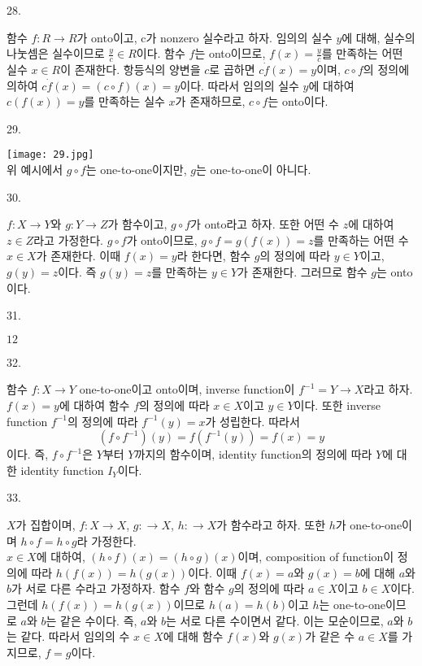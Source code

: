 \documentclass{article}
\begin{document}
28.
\begin{addmargin}[1em]{2em}
함수 $f:R\rightarrow R$가 onto이고, c가 nonzero 실수라고 하자. 임의의 실수 $y$에 대해, 실수의 나눗셈은 실수이므로 $\frac{y}{c}\in R$이다. 함수 $f$는 onto이므로, $f(x)=\frac{y}{c}$를 만족하는 어떤 실수 $x\in R$이 존재한다. 항등식의 양변을 $c$로 곱하면 $c\dot f(x)=y$이며, $c\circ f$의 정의에 의하여 $c\dot f(x)=(c\circ f)(x)=y$이다. 따라서 임의의 실수 $y$에 대하여 $c(f(x))=y$를 만족하는 실수 $x$가 존재하므로, $c\circ f$는 onto이다.

\end{addmargin}
\bigskip

29.
\begin{addmargin}[1em]{2em}
\texttt{[image: 29.jpg]} \\
위 예시에서 $g\circ f$는 one-to-one이지만, $g$는 one-to-one이 아니다.
\end{addmargin}
\bigskip

30.
\begin{addmargin}[1em]{2em}
$f:X\rightarrow Y$와 $g:Y\rightarrow Z$가 함수이고, $g\circ f$가 onto라고 하자. 또한 어떤 수 $z$에 대하여 $z\in Z$라고 가정한다. $g\circ f$가 onto이므로, $g\circ f=g(f(x))=z$를 만족하는 어떤 수 $x\in X$가 존재한다. 이때 $f(x)=y$라 한다면, 함수 $g$의 정의에 따라 $y\in Y$이고, $g(y)=z$이다. 즉 $g(y)=z$를 만족하는 $y\in Y$가 존재한다. 그러므로 함수 $g$는 onto이다.
\end{addmargin}
\bigskip

31.
\begin{addmargin}[1em]{2em}
$12$
\end{addmargin}
\bigskip

32.
\begin{addmargin}[1em]{2em}
함수 $f:X\rightarrow Y$ one-to-one이고 onto이며, inverse function이 $f^{-1}=Y\rightarrow X$라고 하자. $f(x)=y$에 대하여 함수 $f$의 정의에 따라 $x \in X$이고 $y \in Y$이다. 또한 inverse function $f^{-1}$의 정의에 따라 $f^{-1}(y)=x$가 성립한다. 따라서 \\
\[ (f\circ f^{-1})(y)=f(f^{-1}(y))=f(x)=y\]
이다. 즉, $f\circ f^{-1}$은 $Y$부터 $Y$까지의 함수이며, identity function의 정의에 따라 $Y$에 대한 identity function $I_Y$이다.
\end{addmargin}
\bigskip

33.
\begin{addmargin}[1em]{2em}
$X$가 집합이며, $f:X\rightarrow X$, $g:\rightarrow X$, $h:\rightarrow X$가 함수라고 하자. 또한 $h$가 one-to-one이며 $h\circ f=h\circ g$라 가정한다. \\ $x\in X$에 대하여, $(h\circ f)(x)=(h\circ g)(x)$이며, composition of function이 정의에 따라 $h(f(x))=h(g(x))$이다. 이때 $f(x)=a$와 $g(x)=b$에 대해 $a$와 $b$가 서로 다른 수라고 가정하자. 함수 $f$와 함수 $g$의 정의에 따라 $a\in X$이고 $b\in X$이다. 그런데 $h(f(x))=h(g(x))$이므로 $h(a)=h(b)$이고 $h$는 one-to-one이므로 $a$와 $b$는 같은 수이다. 즉, $a$와 $b$는 서로 다른 수이면서 같다. 이는 모순이므로, $a$와 $b$는 같다. 따라서 임의의 수 $x\in X$에 대해 함수 $f(x)$와 $g(x)$가 같은 수 $a\in X$를 가지므로, $f=g$이다.


\end{addmargin}
\bigskip
\end{document}
